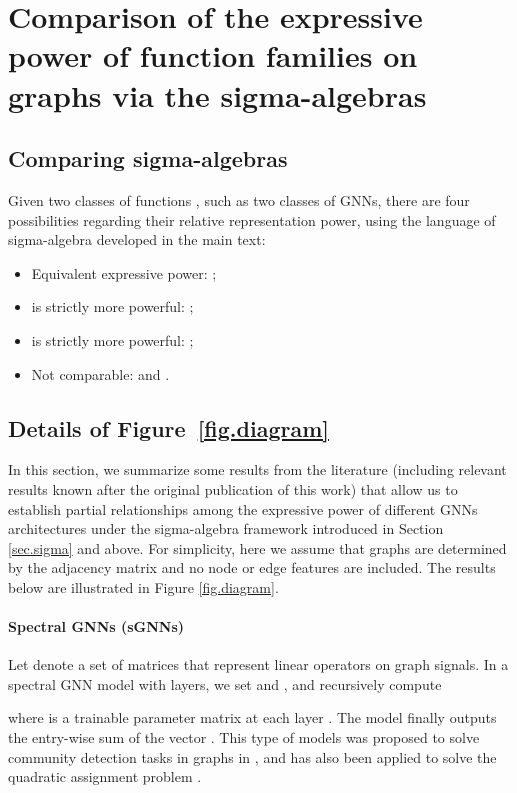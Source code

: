 \documentclass{article}
\begin{document}
\section{Comparison of the expressive power of function families on graphs via the sigma-algebras} \label{app.comparison}
\subsection{Comparing sigma-algebras}
Given two classes of functions , such as two classes of GNNs, there are four possibilities regarding their relative representation power, using the language of sigma-algebra developed in the main text:

\begin{itemize}
    \item Equivalent expressive power: ; 
    \item  is strictly more powerful: ;
    \item  is strictly more powerful: ;
    \item Not comparable:  and .
\end{itemize}

\subsection{Details of Figure~\ref{fig.diagram}}
\label{app:diagram}
In this section, we summarize some results from the literature (including relevant results known after the original publication of this work) that allow us to establish partial relationships among the expressive power of different GNNs architectures under the sigma-algebra framework introduced in Section \ref{sec.sigma} and above. For simplicity, here we assume that graphs are determined by the adjacency matrix  and no node or edge features are included. The results below are illustrated in Figure \ref{fig.diagram}.

\paragraph{Spectral GNNs (sGNNs)} Let  denote a set of  matrices that represent linear operators on graph signals. 
In a spectral GNN model with  layers, we set  and , and recursively compute

where  is a trainable parameter matrix at each layer . The model finally outputs the entry-wise sum of the vector .
This type of models was proposed to solve community detection tasks in graphs in \cite{chen2019cdsbm}, and has also been applied to solve the quadratic assignment problem \cite{nowak2017note}. 
\end{document}
